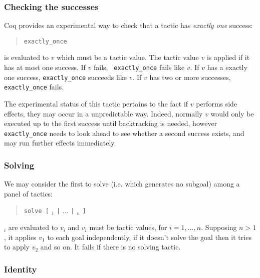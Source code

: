 \subsubsection[Checking the successes]{Checking the successes}

Coq provides an experimental way to check that a tactic has \emph{exactly one} success:
\begin{quote}
{\tt exactly\_once} {\tacexpr}
\end{quote}
{\tacexpr} is evaluated to $v$ which must be a tactic value.
The tactic value $v$ is
applied if it has at most one success. If $v$ fails, {\tt
  exactly\_once} {\tacexpr} fails like $v$. If $v$ has a exactly one
success, {\tt exactly\_once} {\tacexpr} succeeds like $v$. If $v$ has
two or more successes, {\tt exactly\_once} {\tacexpr} fails.

The experimental status of this tactic pertains to the fact if $v$ performs side effects, they may occur in a unpredictable way. Indeed, normally $v$ would only be executed up to the first success until backtracking is needed, however {\tt exactly\_once} needs to look ahead to see whether a second success exists, and may run further effects immediately.

\ErrMsg {}

\subsubsection[Solving]{Solving
}

We may consider the first to solve (i.e. which generates no subgoal) among a
panel of tactics:
\begin{quote}
{\tt solve [} {\tacexpr}$_1$ {\tt |} $...$ {\tt |} {\tacexpr}$_n$ {\tt ]}
\end{quote}
{\tacexpr}$_i$ are evaluated to $v_i$ and $v_i$ must be tactic values,
for $i=1,...,n$. Supposing $n>1$, it applies $v_1$ to each goal
independently, if it doesn't solve the goal then it tries to apply
$v_2$ and so on. It fails if there is no solving tactic.

\ErrMsg {}

\subsubsection[Identity]{Identity\label{ltac:idtac}
}

